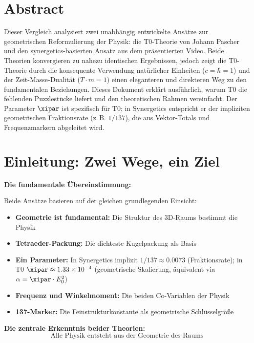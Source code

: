 \section*{Abstract}
		Dieser Vergleich analysiert zwei unabhängig entwickelte Ansätze zur geometrischen Reformulierung der Physik: die T0-Theorie von Johann Pascher und den synergetics-basierten Ansatz aus dem präsentierten Video. Beide Theorien konvergieren zu nahezu identischen Ergebnissen, jedoch zeigt die T0-Theorie durch die konsequente Verwendung natürlicher Einheiten ($c = \hbar = 1$) und der Zeit-Masse-Dualität ($T \cdot m = 1$) einen eleganteren und direkteren Weg zu den fundamentalen Beziehungen. Dieses Dokument erklärt ausführlich, warum T0 die fehlenden Puzzlestücke liefert und den theoretischen Rahmen vereinfacht. Der Parameter $\xipar$ ist spezifisch für T0; in Synergetics entspricht er der impliziten geometrischen Fraktionsrate (z.\,B. $1/137$), die aus Vektor-Totals und Frequenzmarkern abgeleitet wird.

	
	
	\section{Einleitung: Zwei Wege, ein Ziel}
	
	\begin{gemeinsam}
		\textbf{Die fundamentale Übereinstimmung:}
		
		Beide Ansätze basieren auf der gleichen grundlegenden Einsicht:
		\begin{itemize}
			\item \textbf{Geometrie ist fundamental:} Die Struktur des 3D-Raums bestimmt die Physik
			\item \textbf{Tetraeder-Packung:} Die dichteste Kugelpackung als Basis
			\item \textbf{Ein Parameter:} In Synergetics implizit $1/137 \approx 0.0073$ (Fraktionsrate); in T0 $\xipar \approx 1.33 \times 10^{-4}$ (geometrische Skalierung, äquivalent via $\alpha = \xipar \cdot E_0^2$)
			\item \textbf{Frequenz und Winkelmoment:} Die beiden Co-Variablen der Physik
			\item \textbf{137-Marker:} Die Feinstrukturkonstante als geometrische Schlüsselgröße
		\end{itemize}
		
		\textbf{Die zentrale Erkenntnis beider Theorien:}
		\begin{equation}
			\boxed{\text{Alle Physik entsteht aus der Geometrie des Raums}}
		\end{equation}
	\end{gemeinsam}
	
